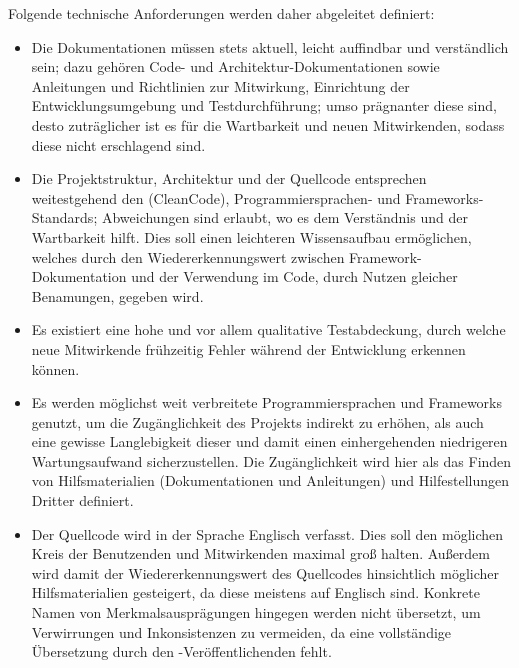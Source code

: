 Folgende technische Anforderungen werden daher abgeleitet definiert:
\begin{itemize}
    \item\label{itm:TA.Dokumentation} Die Dokumentationen müssen stets aktuell, leicht auffindbar und verständlich sein;
    dazu gehören \uA Code- und Architektur-Dokumentationen sowie Anleitungen und Richtlinien zur Mitwirkung, Einrichtung der Entwicklungsumgebung und Testdurchführung;
    umso prägnanter diese sind, desto zuträglicher ist es für die Wartbarkeit und \insb neuen Mitwirkenden, sodass diese nicht erschlagend sind.

    \item\label{itm:TA.Standard} Die Projektstruktur, Architektur und der Quellcode entsprechen weitestgehend den  (\zB CleanCode), Programmiersprachen- und Frameworks-Standards;
    Abweichungen sind erlaubt, wo es \insb dem Verständnis und der Wartbarkeit hilft.
    Dies soll einen leichteren Wissensaufbau ermöglichen, welches \zB durch den Wiedererkennungswert zwischen Framework-Dokumentation und der Verwendung im Code, durch Nutzen gleicher Benamungen, gegeben wird.

    \item\label{itm:TA.Tests} Es existiert eine hohe und vor allem qualitative Testabdeckung, durch welche \insb neue Mitwirkende frühzeitig Fehler während der Entwicklung erkennen können.

    \item\label{itm:TA.Popularitaet} Es werden möglichst weit verbreitete Programmiersprachen und Frameworks genutzt, um die Zugänglichkeit des Projekts indirekt zu erhöhen, als auch eine gewisse Langlebigkeit dieser und damit einen einhergehenden niedrigeren Wartungsaufwand sicherzustellen.
    Die Zugänglichkeit wird hier als das Finden von Hilfsmaterialien (\zB Dokumentationen und Anleitungen) und Hilfestellungen Dritter definiert.

    \item Der Quellcode wird in der Sprache Englisch verfasst.
    Dies soll den möglichen Kreis der Benutzenden und Mitwirkenden maximal groß halten.
    Außerdem wird damit der Wiedererkennungswert des Quellcodes hinsichtlich möglicher Hilfsmaterialien gesteigert, da diese meistens auf Englisch sind.
    Konkrete Namen von Merkmalsausprägungen hingegen werden nicht übersetzt, um Verwirrungen und Inkonsistenzen zu vermeiden, da eine vollständige Übersetzung durch den -Veröffentlichenden fehlt.
\end{itemize}
